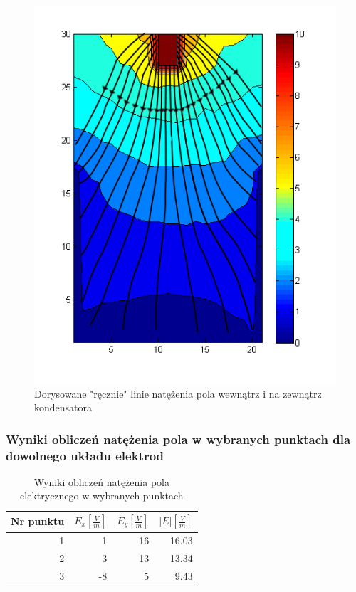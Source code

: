 \documentclass{article}
\begin{document}
\begin{figure}[h!]
	\centering
	\includegraphics[scale=0.4]{duzycontourmapLINIE}
	\caption{Dorysowane "ręcznie" linie natężenia pola wewnątrz i na zewnątrz kondensatora}
\end{figure}
\clearpage
\subsubsection{Wyniki obliczeń natężenia pola w wybranych punktach dla dowolnego układu elektrod}

\begin{table}[h!tbp]
\centering
\begin{tabular}{|r|r|r|r|}
\hline
\multicolumn{1}{|l|}{Nr punktu} & \multicolumn{1}{l|}{$E_{x} [\frac{V}{m}]$} & \multicolumn{1}{l|}{$E_{y} [\frac{V}{m}]$} & \multicolumn{1}{l|}{$|E| [\frac{V}{m}]$} \\ \hline
1 & 1 & 16 & 16.03 \\ \hline
2 & 3 & 13 & 13.34 \\ \hline
3 & -8 & 5 & 9.43 \\ \hline
\end{tabular}
\label{}
\caption{Wyniki obliczeń natężenia pola elektrycznego w wybranych punktach}
\end{table}
\end{document}

